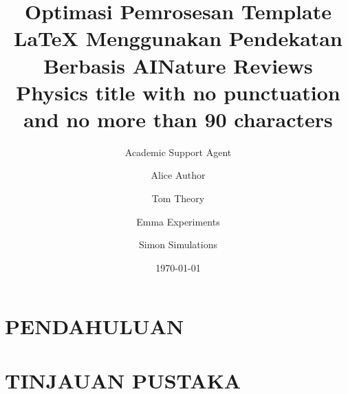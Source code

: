 \documentclass{wlscirep}
\title{Optimasi Pemrosesan Template LaTeX Menggunakan Pendekatan Berbasis AI}
\author{Academic Support Agent}
\date{\today}
\begin{document}
\maketitle

\begin{abstract}

\end{abstract}

\chapter{PENDAHULUAN}


\chapter{TINJAUAN PUSTAKA}


\usepackage[utf8]{inputenc}
\usepackage[T1]{fontenc}
\usepackage{bm}
\title{Nature Reviews Physics title with no punctuation and no more than 90 characters}

\author[1,*]{Alice Author}
\author[2]{Tom Theory}
\author[1,2]{Emma Experiments}
\author[2]{Simon Simulations}

\end{document}
